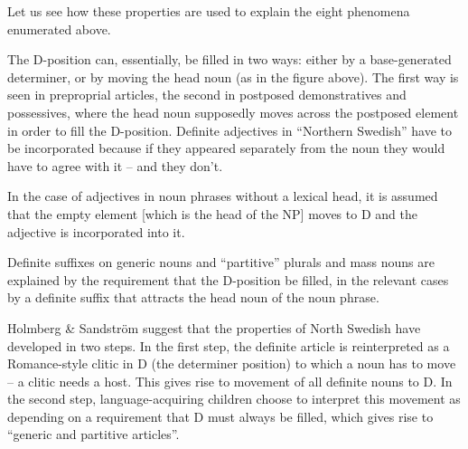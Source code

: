 
Let us see how these properties are used to explain the eight phenomena enumerated above. 


The D-position can, essentially, be filled in two ways: either by a base-generated determiner, or by moving the head noun (as in the figure above). The first way is seen in preproprial articles, the second in postposed demonstratives and possessives, where the head noun supposedly moves across the postposed element in order to fill the D-position. Definite adjectives in “Northern Swedish” have to be incorporated because if they appeared separately from the noun they would have to agree with it – and they don’t. 


In the case of adjectives in noun phrases without a lexical head, it is assumed that the empty element  [which is the head of the NP] moves to D and the adjective is incorporated into it. 


Definite suffixes on generic nouns and “partitive” plurals and mass nouns are explained by the requirement that the D-position be filled, in the relevant cases by a definite suffix that attracts the head noun of the noun phrase. 


Holmberg \& Sandström suggest that the properties of North Swedish have developed in two steps. In the first step, the definite article is reinterpreted as a Romance-style clitic in D (the determiner position) to which a noun has to move – a clitic needs a host. This gives rise to movement of all definite nouns to D. In the second step, language-acquiring children choose to interpret this movement as depending on a requirement that D must always be filled, which gives rise to “generic and partitive articles”. 

